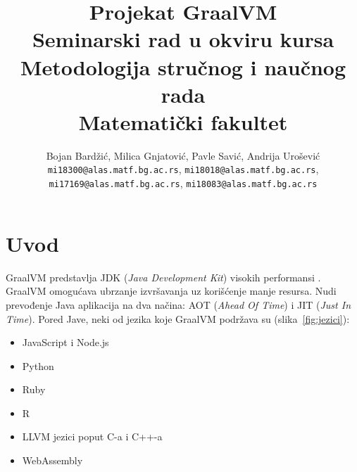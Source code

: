 \documentclass[a4paper]{article}
\begin{document}
\title{Projekat GraalVM\\ \small{Seminarski rad u okviru kursa\\Metodologija stručnog i naučnog rada\\ Matematički fakultet}}

\author{Bojan Bardžić, Milica Gnjatović, Pavle Savić, Andrija Urošević\\ 
	\texttt{mi18300@alas.matf.bg.ac.rs}, 
	\texttt{mi18018@alas.matf.bg.ac.rs}, \\ 
	\texttt{mi17169@alas.matf.bg.ac.rs}, 
	\texttt{mi18083@alas.matf.bg.ac.rs}}


\maketitle


\tableofcontents

\newpage

\section{Uvod}
\label{sec:uvod}
GraalVM predstavlja JDK (\emph{Java Development Kit}) visokih performansi \cite{graalvmintroduction}. GraalVM omogućava ubrzanje izvršavanja uz korišćenje manje resursa. Nudi prevođenje Java aplikacija na dva načina: AOT (\emph{Ahead Of Time}) i JIT (\emph{Just In Time}). Pored Jave, neki od jezika koje GraalVM podržava su (slika~\ref{fig:jezici}): 
\begin{itemize}
	\item JavaScript i Node.js
	\item Python
	\item Ruby
	\item R
	\item LLVM jezici poput C-a i C++-a
	\item WebAssembly
\end{itemize}
\end{document}
